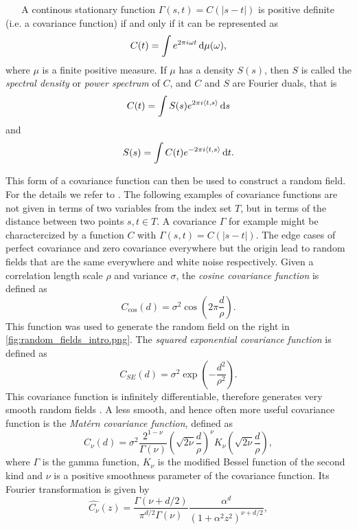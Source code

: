\begin{theorem}~\label{thm:bochner}
    ~\cite[Thm. 19]{bochner1933monotone}
    A continous stationary function \( \Gamma(s,t)= C(\lvert s-t \rvert) \) is
    positive definite (i.e. a covariance function) if and only if it can be represented as
    \[
        C(t) =  \int e^{ 2 \pi i \omega t} \dx[\mu](\omega),
    \] 
    where $\mu$ is a finite positive measure.
    If $\mu$ has a density \( S(s) \), then $S$ is called the \textit{spectral density} or \textit{power spectrum} of $C$, and $C$ and $S$ are Fourier duals, that is
    \[
        C(t) = \int S(s) e^{2 \pi i \langle t, s \rangle} \dx[s]
    \]
    and
    \[
        S(s) = \int C(t) e^{-2 \pi i \langle t, s \rangle} \dx[t].
    \]
\end{theorem}
This form of a covariance function can then be used to construct a random field. For the details we refer to \cite[p.84]{cressie1993statistics}.
%
The following examples of covariance functions are not given in terms of two variables from the index set $T$, but in terms of the distance between two points \( s,t \in T \). A covariance $\Gamma$ for example might be charactercized by a function $C$ with \( \Gamma(s,t) = C(\lvert s-t \rvert) \). The edge cases of perfect covariance and zero covariance everywhere but the origin lead to random fields that are the same everywhere and white noise respectively.
Given a correlation length scale $\rho$ and variance $\sigma$, the  \textit{cosine covariance function} is defined as
\[
    C_{\cos}(d) =\sigma^2 \cos\left(2 \pi \frac{d}{\rho}\right).
\]
This function was used to generate the random field on the right in \cref{fig:random_fields_intro.png}.
The \textit{squared exponential covariance function} is defined as
\[
    C_{SE}(d) = \sigma^2 \exp\left(-\frac{d^2}{\rho^2}\right).
\]
This covariance function is infinitely differentiable, therefore generates very smooth random fields \cite{adler2007random}.
A less smooth, and hence often more useful covariance function is the \textit{Matérn covariance function}, defined as
\[
    C_{\nu}(d) = \sigma^2 \frac{2^{1-\nu}}{\Gamma(\nu)} \left( \sqrt{2\nu} \frac{d}{\rho} \right)^{\nu} K_{\nu} (\sqrt{2\nu} \frac{d}{\rho}),
\]
where $\Gamma$ is the gamma function, \( K_{\nu} \) is the modified Bessel function of the second kind and $\nu$ is a positive smoothness parameter of the covariance function.
Its Fourier transformation is given by
\[
    \hat{C_{\nu}}(z) =  \frac{\Gamma(\nu+d/2)}{\pi^{d/2}\Gamma(\nu)}\frac{\alpha^{d}}{(1+\alpha^2 z^2)^{\nu+d/2}},
\] 
